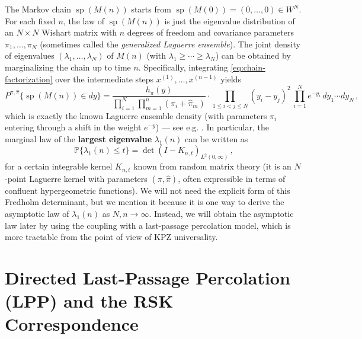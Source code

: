 \documentclass[letterpaper,11pt,oneside,reqno]{article}
\numberwithin{equation}{section}
\theoremstyle{definition}
\begin{document}
The Markov chain $\operatorname{sp}(M(n))$ starts from $\operatorname{sp}(M(0)) = (0,\dots,0)\in W^N$. For each fixed $n$, the law of $\operatorname{sp}(M(n))$ is just the eigenvalue distribution of an $N\times N$ Wishart matrix with $n$ degrees of freedom and covariance parameters $\pi_1,\dots,\pi_N$ (sometimes called the \emph{generalized Laguerre ensemble}). The joint density of eigenvalues $(\lambda_1,\dots,\lambda_N)$ of $M(n)$ (with $\lambda_1\ge\cdots\ge\lambda_N$) can be obtained by marginalizing the chain up to time $n$. Specifically, integrating \eqref{eq:chain-factorization} over the intermediate steps $x^{(1)},\dots,x^{(n-1)}$ yields
\[
P^{\pi,\hat\pi}\{\operatorname{sp}(M(n)) \in dy\} = \frac{h_\pi(y)}{\prod_{i=1}^N \prod_{m=1}^n (\pi_i+\hat\pi_m)} \cdot \prod_{1\le i<j\le N} (y_i - y_j)^2 \, \prod_{i=1}^N e^{-y_i}\, dy_1\cdots dy_N\,,
\]
which is exactly the known Laguerre ensemble density (with parameters $\pi_i$ entering through a shift in the weight $e^{-y}$) --- see e.g. \cite{mehta2004random}. In particular, the marginal law of the \textbf{largest eigenvalue} $\lambda_1(n)$ can be written as
\begin{equation}\label{eq:Fredholm}
\mathbb{P}\{\lambda_1(n) \le t\} = \det(I - K_{n,t})_{L^2(0,\infty)}\,,
\end{equation}
for a certain integrable kernel $K_{n,t}$ known from random matrix theory (it is an $N$-point Laguerre kernel with parameters $(\pi,\hat\pi)$, often expressible in terms of confluent hypergeometric functions). We will not need the explicit form of this Fredholm determinant, but we mention it because it is one way to derive the asymptotic law of $\lambda_1(n)$ as $N,n\to\infty$. Instead, we will obtain the asymptotic law later by using the coupling with a last-passage percolation model, which is more tractable from the point of view of KPZ universality.

\section{Directed Last-Passage Percolation (LPP) and the RSK Correspondence}
\end{document}
